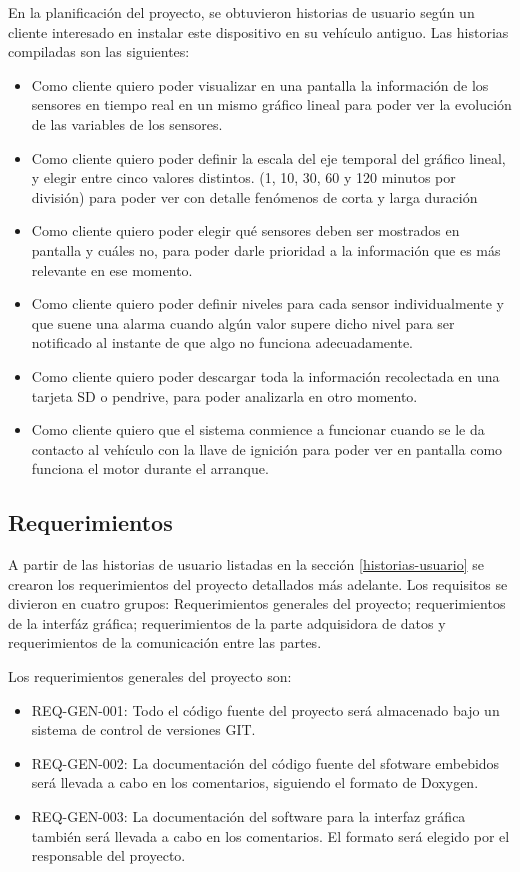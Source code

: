 En la planificación del proyecto, se obtuvieron historias de usuario según un cliente interesado en instalar este dispositivo en su vehículo antiguo. Las historias compiladas son las siguientes:

\begin{itemize}
\item Como cliente quiero poder visualizar en una pantalla la información de los sensores en tiempo real en un mismo gráfico lineal para poder ver la evolución de las variables de los sensores.
\item Como cliente quiero poder definir la escala del eje temporal del gráfico lineal, y elegir entre cinco valores distintos. (1, 10, 30, 60 y 120 minutos por división) para poder ver con detalle fenómenos de corta y larga duración
\item Como cliente quiero poder elegir qué sensores deben ser mostrados en pantalla y cuáles no, para poder darle prioridad a la información que es más relevante en ese momento.
\item Como cliente quiero poder definir niveles para cada sensor individualmente y que suene una alarma cuando algún valor supere dicho nivel para ser notificado al instante de que algo no funciona adecuadamente.
\item Como cliente quiero poder descargar toda la información recolectada en una tarjeta SD o pendrive, para poder analizarla en otro momento.
\item Como cliente quiero que el sistema conmience a funcionar cuando se le da contacto al vehículo con la llave de ignición para poder ver en pantalla como funciona el motor durante el arranque.
\end{itemize}

\subsection{Requerimientos}

A partir de las historias de usuario listadas en la sección \ref{historias-usuario} se crearon los requerimientos del proyecto detallados más adelante. Los requisitos se divieron en cuatro grupos: Requerimientos generales del proyecto; requerimientos de la interfáz gráfica; requerimientos de la parte adquisidora de datos y requerimientos de la comunicación entre las partes.

Los requerimientos generales del proyecto son:
\begin{itemize}
\item REQ-GEN-001: Todo el código fuente del proyecto será almacenado bajo un sistema de control de versiones GIT.
\item REQ-GEN-002: La documentación del código fuente del sfotware embebidos será llevada a cabo en los comentarios, siguiendo el formato de Doxygen.
\item REQ-GEN-003: La documentación del software para la interfaz gráfica también será llevada a cabo en los comentarios. El formato será elegido por el responsable del proyecto.
\end{itemize}

